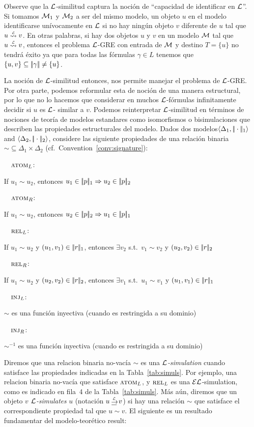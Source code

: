 Observe que la $\mathcal{L}$-similitud captura la noci\'on de ``capacidad de identificar en $\mathcal{L}$''. Si tomamos $\mathcal{M}_1$ y $\mathcal{M}_2$ a ser del mismo modelo, un objeto $u$ en el modelo identificarse un\'ivocamente en $\mathcal{L}$ si no hay ning\'un objeto $v$ diferente de $u$ tal que $u \simil{\+L} v$. En otras palabras, si hay dos objetos $u$ y $v$ en un modelo $\mathcal{M}$  tal que
$u \simil{\+L} v$, entonces el problema $\mathcal{L}$-GRE con entrada de $\mathcal{M}$ y destino $T=\{u\}$ no tendr\'a \'exito ya que para todas las f\'ormulas $\gamma \in L$ tenemos que $\{u,v\} \subseteq |\!|\gamma|\!| \not = \{u\}$.

La noci\'on de $\mathcal{L}$-similitud entonces, nos permite manejar el problema de  $\mathcal{L}$-GRE.
Por otra parte, podemos reformular esta de noci\'on de una manera estructural, por lo que no lo hacemos
que considerar en muchos $\mathcal{L}$-f\'ormulas infinitamente decidir si $u$ es $\mathcal{L}$- similar a $v$. Podemos reinterpretar $\mathcal{L}$-similitud en t\'erminos de nociones de teor\'ia de modelos estandares
como isomorfismos o bisimulaciones que describen las propiedades estructurales del modelo. Dados dos modelos$\langle \Delta_1, |\!|\cdot|\!|_1 \rangle$ and $\langle \Delta_2,
|\!|\cdot|\!|_2 \rangle$, considere las siguiente
propiedades de una relaci\'on binaria ${\sim} \subseteq \Delta_1 \times \Delta_2$ (cf.~Convention~\ref{conv:signature}):
\smallskip 

\newcommand{\simdef}[2]{\noindent\ \ #1\hfill:\ \parbox[t]{.87\textwidth}{#2}\par}

\simdef{$\textsc{atom}_L$}{If $u_1{\sim} u_2$, entonces $u_1 \in |\!|p|\!|_1 \Rightarrow u_2 \in |\!|p|\!|_2$}
\simdef{$\textsc{atom}_R$}{If $u_1{\sim} u_2$, entonces $u_2 \in |\!|p|\!|_2 \Rightarrow u_1 \in |\!|p|\!|_1$}
\simdef{$\textsc{rel}_L$}{If $u_1{\sim} u_2$ y $(u_1,v_1) \in |\!|r|\!|_1$, entonces $\exists v_2$ s.t.\ $v_1{\sim}v_2$
  y $(u_2,v_2) \in |\!|r|\!|_2$}
\simdef{$\textsc{rel}_R$}{If $u_1{\sim}u_2$ y $(u_2,v_2) \in |\!|r|\!|_2$, entonces $\exists v_1$ s.t.\ $u_1{\sim}v_1$ y
 $(u_1,v_1) \in |\!|r|\!|_1$}
\simdef{$\textsc{inj}_L\space$}{$\sim$ es una funci\'on inyectiva (cuando es restringida a su dominio)}
\simdef{$\textsc{inj}_R\space$}{$\sim^{-1}$ es una funci\'on inyectiva (cuando es restringida a su dominio)}
\smallskip

Diremos que una relacion binaria no-vac\'ia $\sim$ es una 
\emph{$\mathcal{L}$-simulation} cuando satisface las propiedades indicadas
en la Tabla~\ref{tab:simuls}. Por ejemplo, una relacion binaria no-vac\'ia que satisface $\textsc{atom}_L$, y $\textsc{rel}_L$ es una $\mathcal{EL}$-simulation, como es indicado en fila~4 de la Tabla~\ref{tab:simuls}. M\'as a\'un, diremos que un objeto
\emph{$v$ $\mathcal{L}$-simulates $u$} (notaci\'on $u \simul{\+L} v$) si hay una relaci\'on $\sim$ que satisface el correspondiente propiedad tal que
$u \sim v$. El siguiente es un resultado fundamentar del modelo-teor\'etico  result:%

